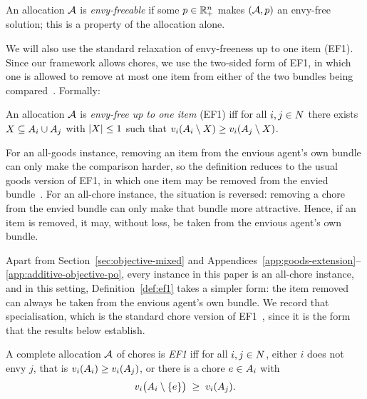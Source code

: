 An allocation $\mathcal{A}$ is \emph{envy-freeable} if some $p \in \mathbb{R}^n_+$ makes $(\mathcal{A},p)$ an envy-free solution; this is a property of the allocation alone. 

We will also use the standard relaxation of envy-freeness up to one item (EF1). Since our framework allows chores, we use the two-sided form of EF1, in which one is allowed to remove at most one item from either of the two bundles being compared~\cite{kawase2025towards}. Formally:
\begin{definition}
\label{def:ef1}
An allocation $\mathcal{A}$ is \emph{envy-free up to one item} (EF1) iff for all
$i, j \in N$ there exists $X \subseteq A_{i} \cup A_{j}$ with
$\left\lvert X\right\rvert \le 1$ such that
$v_i(A_{i} \setminus X) \ge v_i(A_{j} \setminus X)$.
\end{definition}

For an all-goods instance, removing an item from the envious agent's own bundle can only make the comparison harder, so the definition reduces to the usual goods version of EF1, in which one item may be removed from the envied bundle~\cite{HS19}. For an all-chore instance, the situation is reversed: removing a chore from the envied bundle can only make that bundle more attractive. Hence, if an item is removed, it may, without loss, be taken from the envious agent's own bundle.

Apart from Section~\ref{sec:objective-mixed} and Appendices~\ref{app:goods-extension}--\ref{app:additive-objective-po}, every instance in this paper is an all-chore instance, and in this setting, Definition~\ref{def:ef1} takes a simpler form: the item removed can always be taken from the envious agent's own bundle. We record that specialisation, which is the standard chore version of EF1~\cite{aziz2019fair}, since it is the form that the results below establish.

\begin{definition}
\label{def:ef1chores}
A complete allocation $\mathcal{A}$ of chores is \emph{EF1} iff for all
$i, j \in N$, either $i$ does not envy $j$, that is
$v_i(A_{i}) \ge v_i(A_{j})$, or there is a chore
$e \in A_{i}$ with
\[
  v_i\bigl(A_{i} \setminus \left\{e\right\}\bigr) \;\ge\; v_i(A_{j}).
\]
\end{definition}

